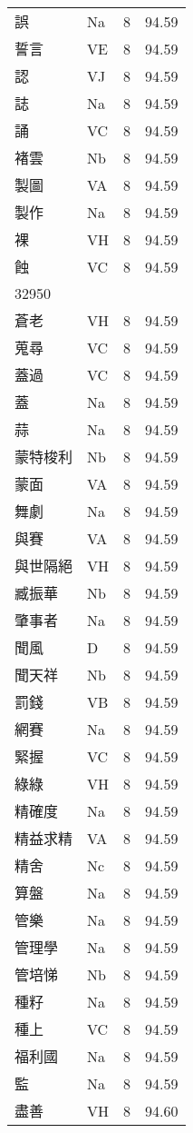 \documentclass[twocolumn]{book}
\begin{document}
\begin{supertabular}{llrr}
誤 & Na & 8 &  94.59\\
誓言 & VE & 8 &  94.59\\
認 & VJ & 8 &  94.59\\
誌 & Na & 8 &  94.59\\
誦 & VC & 8 &  94.59\\
褚雲 & Nb & 8 &  94.59\\
製圖 & VA & 8 &  94.59\\
製作 & Na & 8 &  94.59\\
裸 & VH & 8 &  94.59\\
蝕 & VC & 8 &  94.59\\
32950\\
蒼老 & VH & 8 &  94.59\\
蒐尋 & VC & 8 &  94.59\\
蓋過 & VC & 8 &  94.59\\
蓋 & Na & 8 &  94.59\\
蒜 & Na & 8 &  94.59\\
蒙特梭利 & Nb & 8 &  94.59\\
蒙面 & VA & 8 &  94.59\\
舞劇 & Na & 8 &  94.59\\
與賽 & VA & 8 &  94.59\\
與世隔絕 & VH & 8 &  94.59\\
臧振華 & Nb & 8 &  94.59\\
肇事者 & Na & 8 &  94.59\\
聞風 & D & 8 &  94.59\\
聞天祥 & Nb & 8 &  94.59\\
罰錢 & VB & 8 &  94.59\\
網賽 & Na & 8 &  94.59\\
緊握 & VC & 8 &  94.59\\
綠綠 & VH & 8 &  94.59\\
精確度 & Na & 8 &  94.59\\
精益求精 & VA & 8 &  94.59\\
精舍 & Nc & 8 &  94.59\\
算盤 & Na & 8 &  94.59\\
管樂 & Na & 8 &  94.59\\
管理學 & Na & 8 &  94.59\\
管培悌 & Nb & 8 &  94.59\\
種籽 & Na & 8 &  94.59\\
種上 & VC & 8 &  94.59\\
福利國 & Na & 8 &  94.59\\
監 & Na & 8 &  94.59\\
盡善 & VH & 8 &  94.60\\

\end{supertabular}
\end{document}
